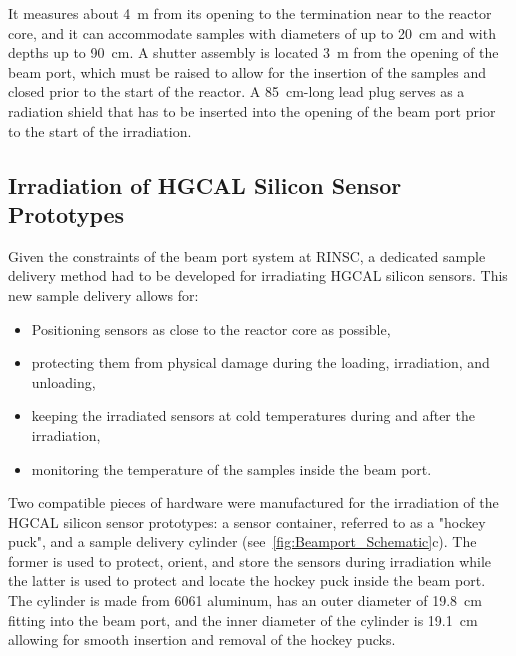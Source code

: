 It measures about \SI{4}{\metre} from its opening to the termination near to the reactor core, and it can accommodate samples with diameters of up to \SI{20}{\centi\metre} and with depths up to \SI{90}{\centi\metre}.
A shutter assembly is located \SI{3}{\metre} from the opening of the beam port, which must be raised to allow for the insertion of the samples and closed prior to the start of the reactor.
A \SI{85}{\centi\metre}-long lead plug serves as a radiation shield that has to be inserted into the opening of the beam port prior to the start of the irradiation.

\subsection{Irradiation of HGCAL Silicon Sensor Prototypes}
\label{subsec:irradiation}
Given the constraints of the beam port system at RINSC, a dedicated sample delivery method had to be developed for irradiating HGCAL silicon sensors.
This new sample delivery allows for:
\begin{itemize}
  \item Positioning sensors as close to the reactor core as possible,
  \item protecting them from physical damage during the loading, irradiation, and unloading,
  \item keeping the irradiated sensors at cold temperatures during and after the irradiation,
  \item monitoring the temperature of the samples inside the beam port.
\end{itemize}
Two compatible pieces of hardware were manufactured for the irradiation of the HGCAL silicon sensor prototypes: a sensor container, referred to as a "hockey puck", and a sample delivery cylinder (see~\ref{fig:Beamport_Schematic}c). 
The former is used to protect, orient, and store the sensors during irradiation while the latter is used to protect and locate the hockey puck inside the beam port.
The cylinder is made from 6061 aluminum, has an outer diameter of \SI{19.8}{\centi\metre} fitting into the beam port, and the inner diameter of the cylinder is \SI{19.1}{\centi\metre} allowing for smooth insertion and removal of the hockey pucks.
